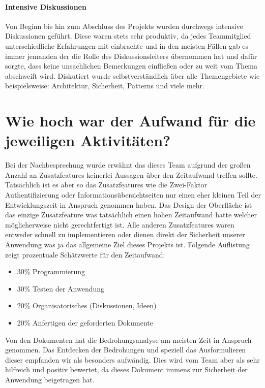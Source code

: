 \documentclass[12pt,DIV14,BCOR10mm,a4paper,parskip=half-,headsepline,headinclude,english,ngerman,bibliography=totocnumbered]{scrreprt}
\begin{document}
\paragraph{Intensive Diskussionen} Von Beginn bis hin zum Abschluss des Projekts wurden durchwegs intensive Diskussionen geführt. Diese waren stets sehr produktiv, da jedes Teammitglied unterschiedliche Erfahrungen mit einbrachte und in den meisten Fällen gab es immer jemanden der die Rolle des Diskussionsleiters übernommen hat und dafür sorgte, dass keine unsachlichen Bemerkungen einfließen oder zu weit vom Thema abschweift wird. Diskutiert wurde selbstverständlich über alle Themengebiete wie beispielsweise: Architektur, Sicherheit, Patterns und viele mehr.

\section{Wie hoch war der Aufwand für die jeweiligen Aktivitäten?}
Bei der Nachbesprechung wurde erwähnt das dieses Team aufgrund der großen Anzahl an Zusatzfeatures keinerlei Aussagen über den Zeitaufwand treffen sollte. Tatsächlich ist es aber so das Zusatzfeatures wie die Zwei-Faktor Authentifizierung oder Informationsübersichtseiten nur einen eher kleinen Teil der Entwicklungszeit in Anspruch genommen haben. Das Design der Oberfläche ist das einzige Zusatzfeature was tatsächlich einen hohen Zeitaufwand hatte welcher möglicherweise nicht gerechtfertigt ist. Alle anderen Zusatzfeatures waren entweder schnell zu implementieren oder dienen direkt der Sicherheit unserer Anwendung was ja das allgemeine Ziel dieses Projekts ist. Folgende Auflistung zeigt prozentuale Schätzwerte für den Zeitaufwand:

\begin{itemize}
  \item 30\% Programmierung
  \item 30\% Testen der Anwendung
  \item 20\% Organisatorisches (Diskussionen, Ideen)
  \item 20\% Anfertigen der geforderten Dokumente
\end{itemize}

Von den Dokumenten hat die Bedrohungsanalyse am meisten Zeit in Anspruch genommen. Das Entdecken der Bedrohungen und speziell das Ausformulieren dieser empfanden wir als besonders aufwändig. Dies wird vom Team aber als sehr hilfreich und positiv bewertet, da dieses Dokument immens zur Sicherheit der Anwendung beigetragen hat.
\end{document}
